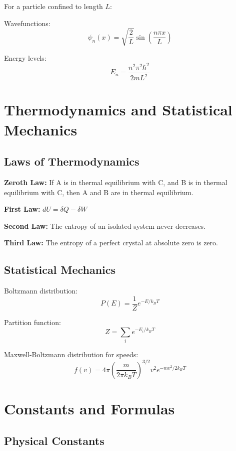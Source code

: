 \documentclass[11pt]{book}
\begin{document}
For a particle confined to length $L$:

Wavefunctions:
\[ \psi_n(x) = \sqrt{\frac{2}{L}} \sin\left(\frac{n\pi x}{L}\right) \]

Energy levels:
\[ E_n = \frac{n^2\pi^2\hbar^2}{2mL^2} \]

\chapter{Thermodynamics and Statistical Mechanics}

\section{Laws of Thermodynamics}

\textbf{Zeroth Law:} If A is in thermal equilibrium with C, and B is in thermal equilibrium with C, then A and B are in thermal equilibrium.

\textbf{First Law:} $dU = \delta Q - \delta W$

\textbf{Second Law:} The entropy of an isolated system never decreases.

\textbf{Third Law:} The entropy of a perfect crystal at absolute zero is zero.

\section{Statistical Mechanics}

Boltzmann distribution:
\[ P(E) = \frac{1}{Z} e^{-E/k_BT} \]

Partition function:
\[ Z = \sum_i e^{-E_i/k_BT} \]

Maxwell-Boltzmann distribution for speeds:
\[ f(v) = 4\pi \left(\frac{m}{2\pi k_B T}\right)^{3/2} v^2 e^{-mv^2/2k_BT} \]

\backmatter

\appendix

\chapter{Constants and Formulas}

\section{Physical Constants}
\end{document}
